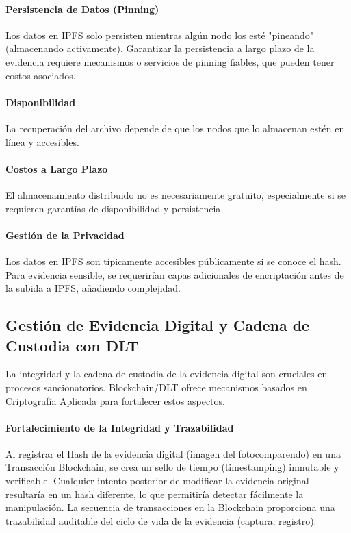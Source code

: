 \paragraph{Persistencia de Datos (Pinning)} Los datos en IPFS solo persisten mientras algún nodo los esté "pineando" (almacenando activamente). Garantizar la persistencia a largo plazo de la evidencia requiere mecanismos o servicios de pinning fiables, que pueden tener costos asociados. 

\paragraph{Disponibilidad} La recuperación del archivo depende de que los nodos que lo almacenan estén en línea y accesibles. 

\paragraph{Costos a Largo Plazo} El almacenamiento distribuido no es necesariamente gratuito, especialmente si se requieren garantías de disponibilidad y persistencia. 

\paragraph{Gestión de la Privacidad} Los datos en IPFS son típicamente accesibles públicamente si se conoce el hash. Para evidencia sensible, se requerirían capas adicionales de encriptación antes de la subida a IPFS, añadiendo complejidad. 

\subsection{Gestión de Evidencia Digital y Cadena de Custodia con DLT}

La integridad y la cadena de custodia de la evidencia digital son cruciales en procesos sancionatorios. Blockchain/DLT ofrece mecanismos basados en Criptografía Aplicada para fortalecer estos aspectos. 

\paragraph{Fortalecimiento de la Integridad y Trazabilidad} Al registrar el Hash de la evidencia digital (imagen del fotocomparendo) en una Transacción Blockchain, se crea un sello de tiempo (timestamping) inmutable y verificable. Cualquier intento posterior de modificar la evidencia original resultaría en un hash diferente, lo que permitiría detectar fácilmente la manipulación. La secuencia de transacciones en la Blockchain proporciona una trazabilidad auditable del ciclo de vida de la evidencia (captura, registro). 

